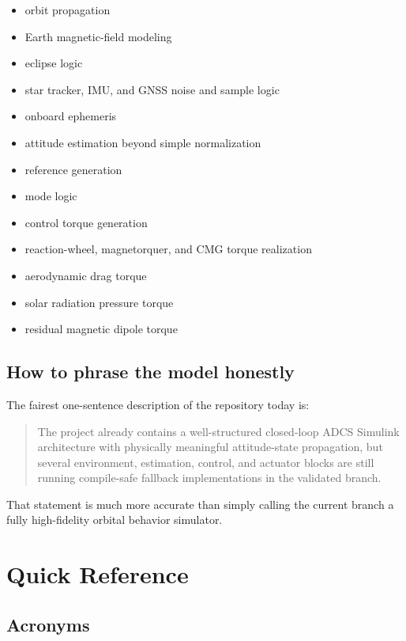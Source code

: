 \documentclass[11pt]{article}
\begin{document}
\begin{itemize}
\item orbit propagation
\item Earth magnetic-field modeling
\item eclipse logic
\item star tracker, IMU, and GNSS noise and sample logic
\item onboard ephemeris
\item attitude estimation beyond simple normalization
\item reference generation
\item mode logic
\item control torque generation
\item reaction-wheel, magnetorquer, and CMG torque realization
\item aerodynamic drag torque
\item solar radiation pressure torque
\item residual magnetic dipole torque
\end{itemize}

\subsection{How to phrase the model honestly}

The fairest one-sentence description of the repository today is:

\begin{quote}
The project already contains a well-structured closed-loop ADCS Simulink architecture with physically meaningful attitude-state propagation, but several environment, estimation, control, and actuator blocks are still running compile-safe fallback implementations in the validated branch.
\end{quote}

That statement is much more accurate than simply calling the current branch a fully high-fidelity orbital behavior simulator.

\section{Quick Reference}

\subsection{Acronyms}
\end{document}
